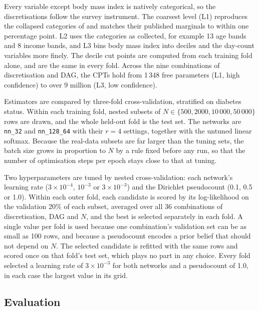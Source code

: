 \documentclass[a4paper,fleqn]{cas-dc}
\begin{document}
Every variable except body mass index is natively categorical, so the discretisations follow the survey instrument. The coarsest level (L1) reproduces the collapsed categories of \citet{zahoor2025investigatingvaliditystructurelearning} and matches their published marginals to within one percentage point. L2 uses the categories as collected, for example 13 age bands and 8 income bands, and L3 bins body mass index into deciles and the day-count variables more finely. The decile cut points are computed from each training fold alone, and are the same in every fold. Across the nine combinations of discretisation and DAG, the CPTs hold from 1\,348 free parameters (L1, high confidence) to over 9 million (L3, low confidence).

Estimators are compared by three-fold cross-validation, stratified on diabetes status. Within each training fold, nested subsets of $N\in\{500, 2000, 10\,000, 50\,000\}$ rows are drawn, and the whole held-out fold is the test set. The networks are \texttt{nn\_32} and \texttt{nn\_128\_64} with their $r=4$ settings, together with the untuned linear softmax. Because the real-data subsets are far larger than the tuning sets, the batch size grows in proportion to $N$ by a rule fixed before any run, so that the number of optimisation steps per epoch stays close to that at tuning.

Two hyperparameters are tuned by nested cross-validation: each network's learning rate ($3\times10^{-4}$, $10^{-3}$ or $3\times10^{-3}$) and the Dirichlet pseudocount (0.1, 0.5 or 1.0). Within each outer fold, each candidate is scored by its log-likelihood on the validation 20\% of each subset, averaged over all 36 combinations of discretisation, DAG and $N$, and the best is selected separately in each fold. A single value per fold is used because one combination's validation set can be as small as 100 rows, and because a pseudocount encodes a prior belief that should not depend on $N$. The selected candidate is refitted with the same rows and scored once on that fold's test set, which plays no part in any choice. Every fold selected a learning rate of $3\times10^{-3}$ for both networks and a pseudocount of 1.0, in each case the largest value in its grid.

\subsection{Evaluation}\label{sec:eval}
\end{document}
